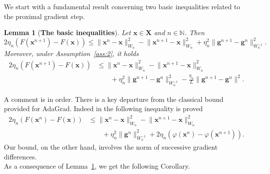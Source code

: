 \documentclass[11pt]{article}
\theoremstyle{plain}
\newtheorem{lemma}[theorem]{Lemma}
\theoremstyle{definition}
\theoremstyle{remark}
\newcommand{\norm}[1]{\lVert{#1}\rVert}
\newcommand{\bHH}{\bm{X}}
\newcommand{\x}{x}
\newcommand{\bx}{\bm{x}}
\newcommand{\buu}{\bm{g}}
\newcommand{\iter}{n}
\newcommand{\N}{\mathbb{N}}
\newcommand{\reg}{\varphi}
\newcommand{\W}{W}
\begin{document}
\noindent
We start with a fundamental result concerning two basic inequalities related to the proximal gradient step.


\begin{lemma}[{\bf The basic inequalities}]\label{lemma1}
Let $\bx\in \bHH$ and $\iter \in \N$. Then 
\begin{equation}\label{lemma1_bound}
    2\eta_\iter(F(\bx^{\iter+1}) - F(\bx))  
    \le \norm{\bx^\iter - \bx}_{\W_\iter}^2- \norm{\bx^{\iter+1} - \bx}_{\W_\iter}^2 + \eta_\iter^2 \norm{\buu^{\iter+1} - \buu^{\iter}}_{\W_\iter^{-1}}^2.
    \end{equation}
Moreover, under Assumption~\ref{ass:2}, it holds
\begin{align}\label{lemma1_bound2}
    \nonumber 2\eta_\iter(F(\bx^{\iter+1}) - F(\bx))  
    &\le \norm{\bx^\iter - \bx}_{\W_\iter}^2
    - \norm{\bx^{\iter+1} - \bx}_{\W_\iter}^2 \\
    &\qquad + \eta_\iter^2 
    \norm{\buu^{\iter+1} - \buu^{\iter}}_{\W_\iter^{-1}}^2 
    - \frac{\eta_\iter}{L}
    \norm{\buu^{\iter+1} - \buu^{\iter}}^2 .
\end{align}
\end{lemma}
\noindent
A comment is in order. There is a key departure from the classical bound provided for AdaGrad. Indeed in \cite{duchi2011adaptive} the following inequality is proved
\begin{align}\label{AdaGradBound}
    \nonumber 2\eta_\iter(F(\bx^{\iter}) - F(\bx))  & \le \lVert \bx^\iter - \bx \rVert_{\W_\iter}^2- \lVert \bx^{\iter+1} - \bx\rVert_{\W_\iter}^2  \\ & \qquad + \eta_\iter^2 \lVert \buu^{\iter} \rVert_{\W_\iter^{-1}}^2 + 2\eta_\iter(\reg(\bx^{\iter}) - \reg(\bx^{\iter+1})).
\end{align}
Our bound, on the other hand, involves the norm of successive gradient differences. \\
As a consequence of Lemma~\ref{lemma1}, we get the following Corollary.  
\end{document}
